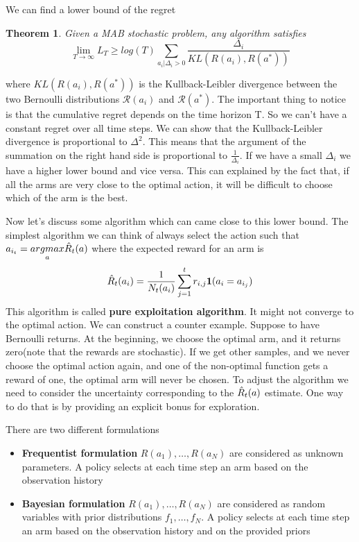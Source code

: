 \documentclass[main.tex]{subfiles}
\newtheorem{theorem}{Theorem}[section]
\begin{document}
We can find a lower bound of the regret
\begin{theorem}
    Given a MAB stochastic problem, any algorithm satisfies
    \begin{equation}
        \lim_{T \rightarrow \infty} L_T \geq log(T) \sum_{a_i|\Delta_i>0} \frac{\Delta_i}{KL(R(a_i),R(a^*))}
    \end{equation}
\end{theorem}
\par \noindent
where $KL(R(a_i),R(a^*))$ is the Kullback-Leibler divergence between the two Bernoulli distributions $\mathcal{R}(a_i)$ and $\mathcal{R}(a^*)$. The important thing to notice is that the cumulative regret depends on the time horizon T. So we can't have a constant regret over all time steps. We can show that the Kullback-Leibler divergence is proportional to $\Delta^2$. This means that the argument of the summation on the right hand side is proportional to $\frac{1}{\Delta_i}$. If we have a small $\Delta_i$ we have a higher lower bound and vice versa. This can explained by the fact that, if all the arms are very close to the optimal action, it will be difficult to choose which of the arm is the best.

Now let's discuss some algorithm which can came close to this lower bound. The simplest algorithm we can think of always select the action such that $a_{i_t} = \underset{a}{argmax} \Hat{R}_t(a)$ where the expected
reward for an arm is
\begin{equation*}
    \Hat{R}_t(a_i) = \frac{1}{N_t(a_i)} \sum_{j=1}^t r_{i,j} \mathbf{1}(a_i = a_{i_j})
\end{equation*}
This algorithm is called \textbf{pure exploitation algorithm}. It might not converge to the optimal action. We can construct a counter example. Suppose to have Bernoulli returns. At the beginning, we choose the optimal arm, and it returns zero(note that the rewards are stochastic). If we get other samples, and we never choose the optimal action again, and one of the non-optimal function gets a reward of one, the optimal arm will never be chosen.
To adjust the algorithm we need to consider the uncertainty corresponding to the $\Hat{R}_t(a)$ estimate. One way to do that is by providing an explicit bonus for exploration.

There are two different formulations
\begin{itemize}
    \item \textbf{Frequentist formulation} $R(a_1), \dots, R(a_N)$ are considered as unknown parameters. A policy selects at each time step an arm based on the observation history
    \item \textbf{Bayesian formulation} $R(a_1), \dots, R(a_N)$ are considered as random variables with prior distributions $f_1,\dots,f_N$. A policy selects at each time step an arm based on the observation history and on the provided priors
\end{itemize}
\end{document}
